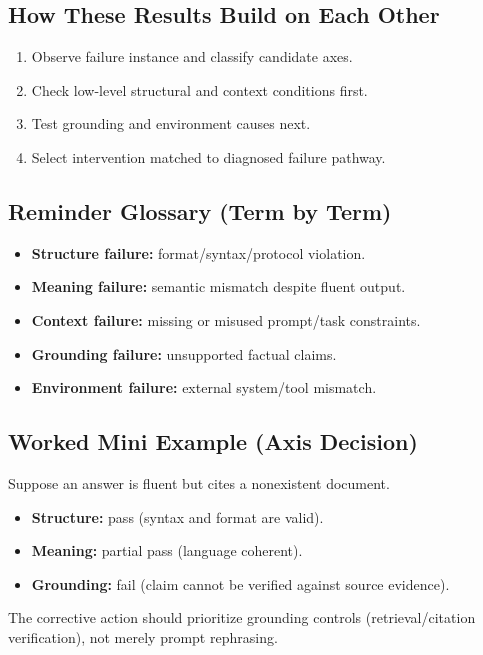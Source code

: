 \subsection*{How These Results Build on Each Other}
\begin{enumerate}[leftmargin=1.5em]
  \item Observe failure instance and classify candidate axes.
  \item Check low-level structural and context conditions first.
  \item Test grounding and environment causes next.
  \item Select intervention matched to diagnosed failure pathway.
\end{enumerate}

\subsection*{Reminder Glossary (Term by Term)}
\begin{itemize}[leftmargin=1.5em]
  \item \textbf{Structure failure:} format/syntax/protocol violation.
  \item \textbf{Meaning failure:} semantic mismatch despite fluent output.
  \item \textbf{Context failure:} missing or misused prompt/task constraints.
  \item \textbf{Grounding failure:} unsupported factual claims.
  \item \textbf{Environment failure:} external system/tool mismatch.
\end{itemize}

\subsection*{Worked Mini Example (Axis Decision)}
Suppose an answer is fluent but cites a nonexistent document.
\begin{itemize}[leftmargin=1.5em]
  \item \textbf{Structure:} pass (syntax and format are valid).
  \item \textbf{Meaning:} partial pass (language coherent).
  \item \textbf{Grounding:} fail (claim cannot be verified against source evidence).
\end{itemize}
The corrective action should prioritize grounding controls (retrieval/citation verification), not merely prompt rephrasing.

